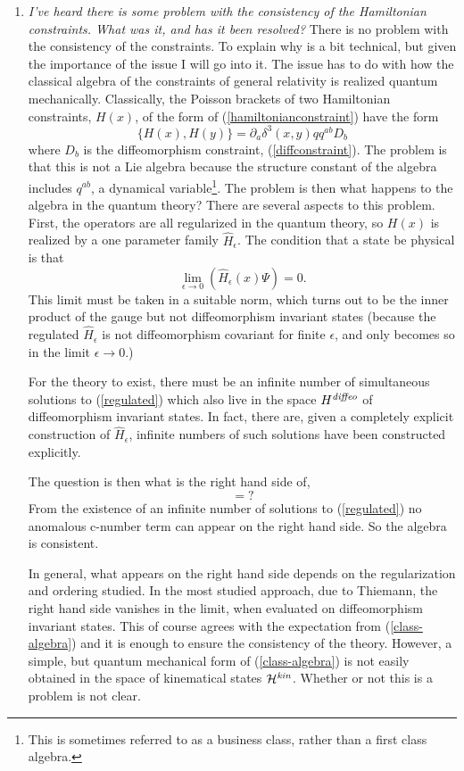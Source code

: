 \documentclass[12pt]{article}
\newcommand{\f}{\begin{equation}}
\newcommand{\ff}{\end{equation}}
\begin{document}
\begin{enumerate}
\item{}{\it I've heard there is some problem with the consistency of the Hamiltonian
constraints\cite{outsideview}. What was it, and has it been resolved?}   There is no problem with the
consistency of the constraints.  To explain why is a bit technical, but given the
importance of the issue I will go into it.  The issue has to do with how the classical
algebra of the constraints of general relativity is realized quantum mechanically\cite{problem1,problem2}. 
Classically, the Poisson brackets of two Hamiltonian constraints, $H(x)$, of the form of 
(\ref{hamiltonianconstraint}) have the
form
\f
\{ H(x) , H(y) \} = \partial_a \delta^3 (x,y) qq^{ab} D_b
\label{class-algebra}
\ff
where $D_b$ is the diffeomorphism constraint, (\ref{diffconstraint}).  The problem is
that  this is not a Lie algebra because the structure constant of the algebra 
includes  $q^{ab}$, a dynamical variable\footnote{This is sometimes referred
to as a business class, rather than a first class algebra.}.
The problem is then  what happens to the algebra in the quantum theory?  There
are several aspects to this problem.  First, the operators are all regularized in the
quantum theory, so $H(x)$ is realized by a one parameter family
$\hat{H}_\epsilon$.   The condition that a state be physical is that
\f
\lim_{\epsilon \rightarrow 0} \left ( \hat{H}_\epsilon (x) \Psi \right ) =0.  
\label{regulated}
\ff
This limit must be taken in a suitable norm, which turns out to be the inner 
product of the gauge but not diffeomorphism invariant states (because the
regulated $\hat{H}_\epsilon$ is not diffeomorphism covariant for finite $\epsilon$, and
only becomes so in the limit $\epsilon \rightarrow 0$.)

For the theory to exist, there must be an infinite number of simultaneous solutions
to (\ref{regulated}) which also live in the space $H^{\it diffeo}$ of
diffeomorphism invariant states. In fact, there are, given a completely
explicit construction of $\hat{H}_\epsilon$, infinite numbers of such
solutions have been constructed explicitly. 

The question is then what is the right hand side of,
\f
[\hat{H}_\epsilon (x) , \hat{H}_{\epsilon^\prime} (y) ]   = ? 
\label{rhs}
\ff   
From the
existence of an infinite number of solutions to (\ref{regulated})  
no anomalous c-number term can appear on the right hand side.   So the
algebra is consistent.  

In general, what appears on the right hand side depends on the regularization
and ordering studied.  In the most studied approach, due to Thiemann, the
right hand side vanishes in the limit, when evaluated on diffeomorphism invariant
states.  This of course agrees with the expectation from (\ref{class-algebra}) and it
is enough to ensure the consistency of the theory. However, a simple, but quantum
mechanical form of (\ref{class-algebra}) is not easily obtained in the space
of kinematical states ${\cal H}^{\it kin}$. Whether or not this is a problem is not clear. 


\end{enumerate}
\end{document}
